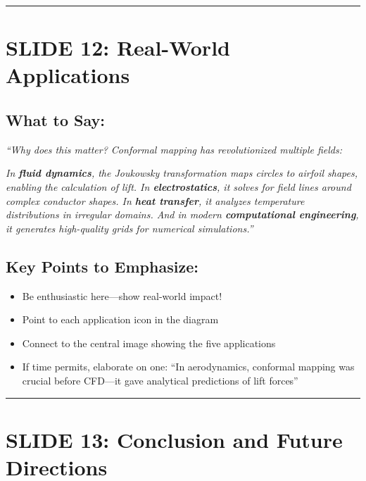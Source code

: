 \documentclass[12pt,a4paper]{article}
\begin{document}
\vspace{10pt}
\hrule
\vspace{10pt}

\section*{SLIDE 12: Real-World Applications}

\subsection*{What to Say:}
\begin{quotebox}
\textit{``Why does this matter? Conformal mapping has revolutionized multiple fields:}

\textit{In \textbf{fluid dynamics}, the Joukowsky transformation maps circles to airfoil shapes, enabling the calculation of lift. In \textbf{electrostatics}, it solves for field lines around complex conductor shapes. In \textbf{heat transfer}, it analyzes temperature distributions in irregular domains. And in modern \textbf{computational engineering}, it generates high-quality grids for numerical simulations.''}
\end{quotebox}

\subsection*{Key Points to Emphasize:}
\begin{itemize}[leftmargin=*]
    \item Be enthusiastic here---show real-world impact!
    \item Point to each application icon in the diagram
    \item Connect to the central image showing the five applications
    \item If time permits, elaborate on one: ``In aerodynamics, conformal mapping was crucial before CFD---it gave analytical predictions of lift forces''
\end{itemize}

\vspace{10pt}
\hrule
\vspace{10pt}

\section*{SLIDE 13: Conclusion and Future Directions}
\end{document}
